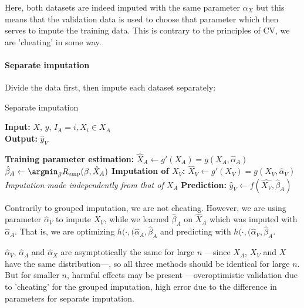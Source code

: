 Here, both datasets are indeed imputed with the same parameter $\alpha_X$ but this means that the validation data is used to choose that parameter which then serves to impute the training data. This is contrary to the principles of CV, we are 'cheating' in some way.

\paragraph{Separate imputation}
Divide the data first, then impute each dataset separately:
\begin{algorithm}[H]
	\caption{Separate imputation}
	\hspace*{\algorithmicindent} \textbf{Input:} $X$, $y$, $I_A={i, X_i \in X_A}$  \\
 	\hspace*{\algorithmicindent} \textbf{Output:} $\hat{y}_V$
	\begin{algorithmic}[1]
		\State \textbf{Training parameter estimation:}
		\Indstate $\hat{X}_A \leftarrow g'(X_A) = g(X_A, \hat{\alpha}_A)$
		\Indstate $\hat{\beta}_A \leftarrow \argmin_{\beta} R_{\text{emp}}(\beta,\hat{X}_A)$
		\State \textbf{Imputation of $X_V$:}
		\Indstate $\hat{X}_V \leftarrow g'(X_V) = g(X_V, \hat{\alpha}_V)$ \Comment \emph{Imputation made independently from that of $X_A$}
		\State \textbf{Prediction:}
		\Indstate $\hat{y}_V \leftarrow f(\hat{X_V}, \hat{\beta}_A)$
	\end{algorithmic}
\end{algorithm}

Contrarily to grouped imputation, we are not cheating. However, we are using parameter $\hat{\alpha}_V$ to impute $X_V$, while we learned $\hat{\beta}_A$ on $\hat{X}_A$ which was imputed with $\hat{\alpha}_A$. That is, we are optimizing $h(\cdot,(\hat{\alpha}_A, \hat{\beta}_A$ and predicting with  $h(\cdot,(\hat{\alpha}_V, \hat{\beta}_A$.

$\hat{\alpha}_V$, $\hat{\alpha}_A$ and $\hat{\alpha}_X$ are asymptotically the same for large $n$ ---since $X_A$, $X_V$ and $X$ have the same distribution---, so all three methods should be identical for large $n$. But for smaller $n$, harmful effects may be present ---overoptimistic validation due to 'cheating' for the grouped imputation, high error due to the difference in parameters for separate imputation.



